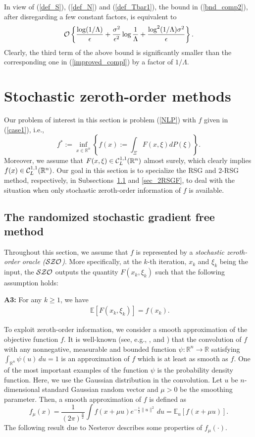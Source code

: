\documentclass[final]{siamltex}
\newcommand{\beq}{\begin{equation}}
\newcommand{\eeq}{\end{equation}}
\newcommand{\beqa}{\begin{eqnarray}}
\newcommand{\eeqa}{\end{eqnarray}}
\def\eqnok#1{(\ref{#1})}
\def\vgap{\vspace*{.1in}}
\newcommand{\bbe}{\mathbb{E}}
\newcommand{\bbr}{\mathbb{R}}
\begin{document}
\vgap

In view of \eqnok{def_S}, \eqnok{def_N} and \eqnok{def_Tbar1}, the bound in \eqnok{bnd_comp2},
after disregarding a few constant factors, is equivalent to
\beq \label{improved_compl1}
{\cal O} \left\{
\frac{\log (1/\Lambda) }{\epsilon} +
\frac{\sigma^2}{\epsilon^2}  \log \frac{1}{\Lambda}
+ \frac{\log^2(1/\Lambda) \sigma^2 }{\epsilon}
\right\}.
\eeq
Clearly, the third term of the above bound is significantly
smaller than the corresponding one in \eqnok{improved_compl}
by a factor of $1/\Lambda$.

\setcounter{equation}{0}
\section{Stochastic zeroth-order methods} \label{sec_zero}
Our problem of interest in this section is problem \eqnok{NLP}
with $f$ given in \eqnok{case1}, i.e.,
\beq \label{NLP1}
f^* := \inf_{x \in \bbr^n} \left\{ f(x) := \int_{\Xi} F(x,\xi) dP(\xi) \right\}.
\eeq
Moreover, we
assume that $F(x, \xi) \in {\cal C}_L^{1,1}(\bbr^n)$ almost surely,
which clearly implies $f(x) \in {\cal C}_L^{1,1}(\bbr^n)$.
Our goal in this section is to specialize the RSG and 2-RSG method,
respectively, in Subsections~\ref{sec_RSGF} and \ref{sec_2RSGF},
to deal with the situation when only stochastic zeroth-order information of $f$ is available.

\subsection{The randomized stochastic gradient free method} \label{sec_RSGF}
Throughout this section, we assume that $f$ is represented by
 a {\sl stochastic zeroth-order oracle ($\cal SZO$)}.
More specifically, at the $k$-th iteration,  $x_k$ and $\xi_k$ being the input,
the $\cal SZO$ outputs the quantity $F(x_k, \xi_k)$ such that
the following assumption holds:

\vgap

{\bf A3:} For any $k \ge 1$, we have
\beqa
\, \, \bbe[F(x_k, \xi_k)] = f(x_k). \label{ass3.a}
\eeqa


To exploit zeroth-order information, we consider a smooth approximation of the objective function $f$.
It is well-known (see, e.g., \cite{RocWet98}, \cite{DuBaMaWa11} and \cite{YoNeSh12}) that the convolution of
$f$ with any nonnegative, measurable and bounded function $\psi: \bbr^n  \to \bbr$ satisfying $\int_{\bbr^n} \psi(u) \,du = 1$ is an
approximation of $f$ which is at least as smooth as $f$. One of the most important examples of the function
$\psi$ is the probability density function. Here, we use the Gaussian distribution in
the convolution. Let $u$ be $n$-dimensional standard Gaussian random vector and $\mu>0$ be the smoothing parameter.
Then, a smooth approximation of $f$ is defined  as
\beq \label{rand_smooth_func}
f_{\mu}(x) = \frac{1}{(2 \pi)^{\frac{n}{2}}} \int f(x+\mu u) e^{-\frac{1}{2}\|u\|^2} \,du =\bbe_u[f(x+\mu u)].
\eeq
The following result due to Nesterov \cite{Nest11-1} describes some properties of $f_{\mu}(\cdot)$.
\end{document}
